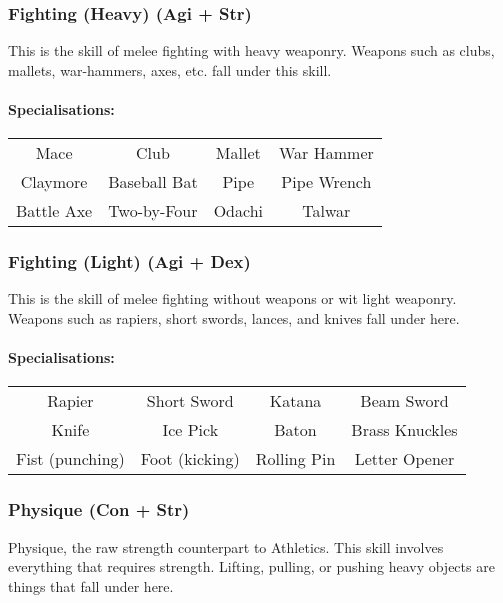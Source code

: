 \subsubsection{Fighting (Heavy) (Agi + Str)}
This is the skill of melee fighting with heavy weaponry. Weapons such as clubs, mallets, war-hammers, axes, etc. fall under this skill.

\paragraph{Specialisations:}
\begin{center}
    \begin{tabular}{c|c|c|c}
        Mace & Club & Mallet & War Hammer \\
        Claymore & Baseball Bat & Pipe & Pipe Wrench \\
        Battle Axe & Two-by-Four & Odachi & Talwar \\
    \end{tabular}
\end{center}

\subsubsection{Fighting (Light) (Agi + Dex)}
This is the skill of melee fighting without weapons or wit light weaponry. 
Weapons such as rapiers, short swords, lances, and knives fall under here.

\paragraph{Specialisations:}
\begin{center}
    \begin{tabular}{c|c|c|c}
        Rapier & Short Sword & Katana & Beam Sword \\
        Knife & Ice Pick & Baton & Brass Knuckles \\
        Fist (punching) & Foot (kicking) & Rolling Pin & Letter Opener \\
    \end{tabular}
\end{center}

\subsubsection{Physique (Con + Str)}
Physique, the raw strength counterpart to Athletics. 
This skill involves everything that requires strength.
Lifting, pulling, or pushing heavy objects are things that fall under here.


